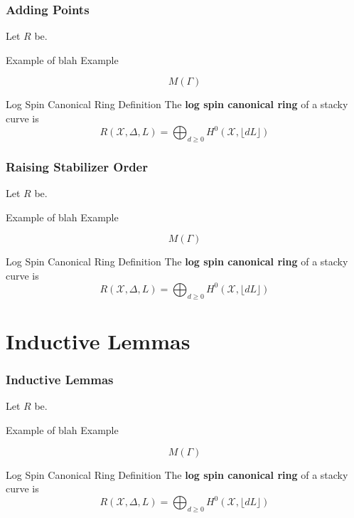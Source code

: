 \documentclass{beamer}
\theoremstyle{remark}
\newcommand \sx{{\mathscr X}}
\newcommand{\halfcan}{L}
\begin{document}
\begin{frame}
\frametitle{Adding Points}
Let $R$ be.

\pause
\begin{exampleblock}{Example of blah}
Example
\end{exampleblock}

\pause
\[
   M(\Gamma)
\]

\pause
\begin{alertblock}{Log Spin Canonical Ring Definition}
The \textbf{log spin canonical ring} of a stacky curve is
\[
	R(\sx, \Delta, \halfcan) = \bigoplus_{d \geq 0} H^0(\sx, \lfloor d \halfcan \rfloor)
\]
\end{alertblock}

\end{frame}

\begin{frame}
\frametitle{Raising Stabilizer Order}
Let $R$ be.

\pause
\begin{exampleblock}{Example of blah}
Example
\end{exampleblock}

\pause
\[
   M(\Gamma)
\]

\pause
\begin{alertblock}{Log Spin Canonical Ring Definition}
The \textbf{log spin canonical ring} of a stacky curve is
\[
	R(\sx, \Delta, \halfcan) = \bigoplus_{d \geq 0} H^0(\sx, \lfloor d \halfcan \rfloor)
\]
\end{alertblock}

\end{frame}

\section{Inductive Lemmas} 

\begin{frame}
\frametitle{Inductive Lemmas}
Let $R$ be.

\pause
\begin{exampleblock}{Example of blah}
Example
\end{exampleblock}

\pause
\[
   M(\Gamma)
\]

\pause
\begin{alertblock}{Log Spin Canonical Ring Definition}
The \textbf{log spin canonical ring} of a stacky curve is
\[
	R(\sx, \Delta, \halfcan) = \bigoplus_{d \geq 0} H^0(\sx, \lfloor d \halfcan \rfloor)
\]
\end{alertblock}

\end{frame}
\end{document}
